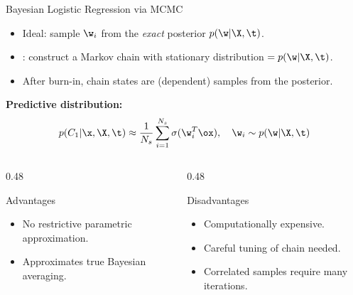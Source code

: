 \begin{frame}{Bayesian Logistic Regression via MCMC}
  \begin{itemize}
    \item Ideal: sample $\w_i$ from the \emph{exact} posterior $p(\w|\X,\t)$.
    \item {}: construct a Markov chain with stationary distribution $= p(\w|\X,\t)$.
    \item After burn-in, chain states are (dependent) samples from the posterior.
  \end{itemize}
  \vspace{0.3cm}
  \textbf{Predictive distribution:}
  \[
    p(C_1|\x,\X,\t) \approx \frac{1}{N_s}\sum_{i=1}^{N_s}\sigma(\w_i^T\ox), \quad \w_i \sim p(\w|\X,\t)
  \]
  \begin{columns}[T]
    \begin{column}{0.48\textwidth}
      \begin{block}{Advantages}
        \begin{itemize}
          \item No restrictive parametric approximation.
          \item Approximates true Bayesian averaging.
        \end{itemize}
      \end{block}
    \end{column}
    \begin{column}{0.48\textwidth}
      \begin{block}{Disadvantages}
        \begin{itemize}
          \item Computationally expensive.
          \item Careful tuning of chain needed.
          \item Correlated samples require many iterations.
        \end{itemize}
      \end{block}
    \end{column}
  \end{columns}
\end{frame}

